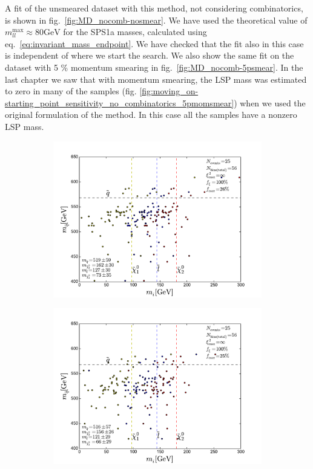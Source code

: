 \documentclass[twoside,english]{uiofysmaster}
\begin{document}
A fit of the unsmeared dataset with this method, not considering combinatorics, is shown in fig.\ \ref{fig:MD_nocomb-nosmear}. We have used the theoretical value of $m_{ll}^\mathrm{max} \approx 80 \mathrm{GeV}$ for the SPS1a masses, calculated using eq.\ \eqref{eq:invariant_mass_endpoint}. We have checked that the fit also in this case is independent of where we start the search. We also show the same fit on the dataset with 5 \% momentum smearing in fig.\ \ref{fig:MD_nocomb-5psmear}. In the last chapter we saw that with momentum smearing, the LSP mass was estimated to zero in many  of the samples (fig. \ref{fig:moving_on-starting_point_sensitivity_no_combinatorics_5pmomsmear}) when we used the original formulation of the method. In this case all the samples have a nonzero LSP mass.
\begin{figure}[hbt]
	\centering
	\begin{subfigure}[b]{0.45\textwidth}
		\includegraphics[width=\textwidth]{figures/improving_combinatorics/herwigpp-MD-dileptonedge-fit-comb-nosmear-nocut_TMP.pdf} 
		\caption{ }
	\end{subfigure}
	\begin{subfigure}[b]{0.45\textwidth}
		\includegraphics[width=\textwidth]{figures/improving_combinatorics/herwigpp-MD-dileptonedge-fit-comb-nosmear-nocut_400-300-200-100.pdf}
		\caption{ } 
	\end{subfigure}


\end{figure}
\end{document}
